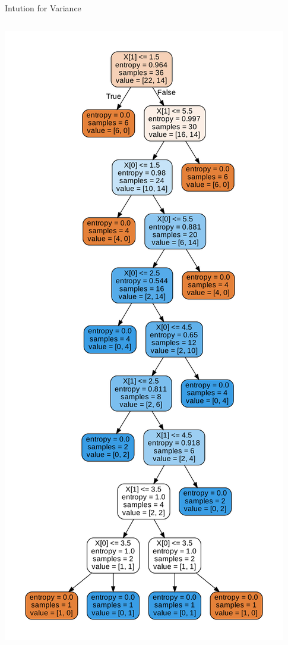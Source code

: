 \documentclass{beamer}
\begin{document}
\begin{frame}{Intution for Variance}
\begin{columns}
\begin{column}{0.5\textwidth}
\begin{center}
\includegraphics[scale=0.2]{bias-variance/imgs/var_1}

\end{center}
\end{column}
\end{columns}
\end{frame}
\end{document}
